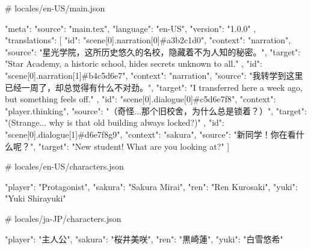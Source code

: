 
%
%


# locales/en-US/main.json

{
  "meta": {
    "source": "main.tex",
    "language": "en-US",
    "version": "1.0.0"
  },
  "translations": [
    {
      "id": "scene[0].narration[0]#a3b2c1d0",
      "context": "narration",
      "source": "星光学院，这所历史悠久的名校，隐藏着不为人知的秘密。",
      "target": "Star Academy, a historic school, hides secrets unknown to all."
    },
    {
      "id": "scene[0].narration[1]#b4c5d6e7",
      "context": "narration",
      "source": "我转学到这里已经一周了，却总觉得有什么不对劲。",
      "target": "I transferred here a week ago, but something feels off."
    },
    {
      "id": "scene[0].dialogue[0]#c5d6e7f8",
      "context": "player.thinking",
      "source": "（奇怪...那个旧校舍，为什么总是锁着？）",
      "target": "(Strange... why is that old building always locked?)"
    },
    {
      "id": "scene[0].dialogue[1]#d6e7f8g9",
      "context": "sakura",
      "source": "新同学！你在看什么呢？",
      "target": "New student! What are you looking at?"
    }
  ]
}


# locales/en-US/characters.json

{
  "player": "Protagonist",
  "sakura": "Sakura Mirai",
  "ren": "Ren Kurosaki",
  "yuki": "Yuki Shirayuki"
}

# locales/ja-JP/characters.json

{
  "player": "主人公",
  "sakura": "桜井美咲",
  "ren": "黒崎蓮",
  "yuki": "白雪悠希"
}


